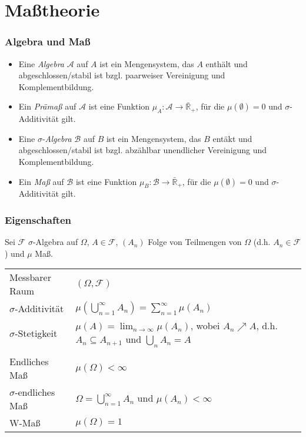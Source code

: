 \documentclass{article}
\begin{document}
\section{Maßtheorie}

\subsubsection*{Algebra und Maß}

\begin{itemize}
\item Eine \emph{Algebra} $\mathcal{A}$ auf $A$ ist ein Mengensystem, das $A$ enthält und abgeschlossen/stabil ist bzgl. paarweiser Vereinigung und Komplementbildung.
\item Ein \emph{Prämaß} auf $\mathcal{A}$ ist eine Funktion $\mu_A : \mathcal{A} \to \mathbb{\bar{R}_+}$, für die $\mu(\emptyset) = 0$ und $\sigma$-Additivität gilt.
\item Eine $\sigma$-\emph{Algebra} $\mathcal{B}$ auf $B$ ist ein Mengensystem, das $B$ entäkt und abgeschlossen/stabil ist bzgl. abzählbar unendlicher Vereinigung und Komplementbildung.
\item Ein \emph{Maß} auf $\mathcal{B}$ ist eine Funktion $\mu_B : \mathcal{B} \to \mathbb{\bar{R}_+}$, für die $\mu(\emptyset) = 0$ und $\sigma$-Additivität gilt.
\end{itemize}

\subsubsection*{Eigenschaften}

Sei $\mathcal{F}$ $\sigma$-Algebra auf $\Omega$, $A \in \mathcal{F}$, $(A_n)$ Folge von Teilmengen von $\Omega$ (d.h. $A_n \in \mathcal{F}$) und $\mu$ Maß.

\begin{tabular}{ll}
Messbarer Raum & $(\Omega, \mathcal{F})$ \\
$\sigma$-Additivität & $\mu(\bigcup_{n=1}^\infty A_n) = \sum_{n=1}^\infty \mu(A_n)$ \\
$\sigma$-Stetigkeit & $\mu(A) = \lim_{n \to \infty} \mu(A_n)$, wobei $A_n \nearrow A$, d.h. $A_n \subseteq A_{n+1}$ und $\bigcup_n A_n = A$ \\
& \\
Endliches Maß & $\mu(\Omega) < \infty$ \\
$\sigma$-endliches Maß & $\Omega = \bigcup_{n=1}^\infty A_n$ und $\mu(A_n) < \infty$ \\
W-Maß & $\mu(\Omega) = 1$ \\
\end{tabular}
\end{document}
